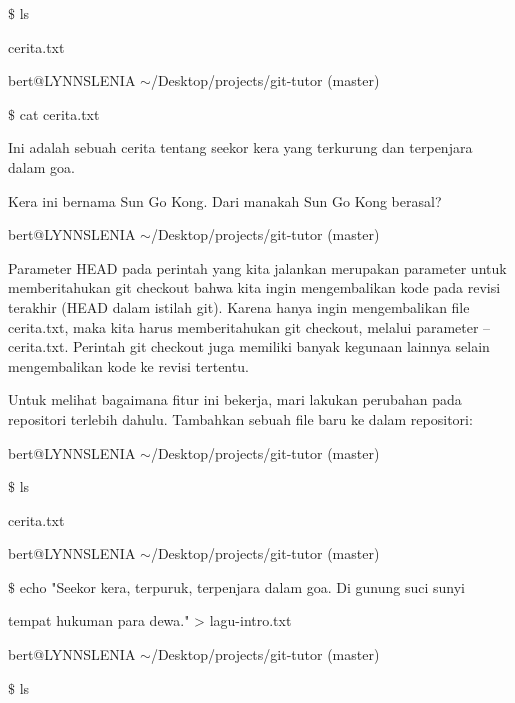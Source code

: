 \noindent 
 $  \$  $ ls \par
\noindent 
cerita.txt \par
\noindent 
bert@LYNNSLENIA  $  \sim  $/Desktop/projects/git-tutor (master) \par
\noindent 
 $  \$  $ cat cerita.txt \par
\noindent 
Ini adalah sebuah cerita tentang seekor kera yang terkurung dan terpenjara dalam goa. \par
\noindent 
Kera ini bernama Sun Go Kong. Dari manakah Sun Go Kong berasal? \par
\noindent 
bert@LYNNSLENIA  $  \sim  $/Desktop/projects/git-tutor (master) \par
\vspace{12pt}
Parameter HEAD pada perintah yang kita jalankan merupakan parameter untuk memberitahukan git checkout bahwa kita ingin mengembalikan kode pada revisi terakhir (HEAD dalam istilah git). Karena hanya ingin mengembalikan file cerita.txt, maka kita harus memberitahukan git checkout, melalui parameter -- cerita.txt. Perintah git checkout juga memiliki banyak kegunaan lainnya selain mengembalikan kode ke revisi tertentu.  \par
Untuk melihat bagaimana fitur ini bekerja, mari lakukan perubahan pada repositori terlebih dahulu. Tambahkan sebuah file baru ke dalam repositori: \par
\noindent 
{\fontsize{10pt}{10pt}\selectfont bert@LYNNSLENIA  $  \sim  $/Desktop/projects/git-tutor (master)} \par
\noindent 
{\fontsize{10pt}{10pt}\selectfont  $  \$  $ ls} \par
\noindent 
{\fontsize{10pt}{10pt}\selectfont cerita.txt} \par
\noindent 
\vspace{10pt}
\noindent 
{\fontsize{10pt}{10pt}\selectfont bert@LYNNSLENIA  $  \sim  $/Desktop/projects/git-tutor (master)} \par
\noindent 
{\fontsize{10pt}{10pt}\selectfont  $  \$  $ echo "Seekor kera, terpuruk, terpenjara dalam goa. Di gunung suci sunyi} \par
\noindent 
{\fontsize{10pt}{10pt}\selectfont tempat hukuman para dewa." > lagu-intro.txt} \par
\noindent 
\vspace{10pt}
\noindent 
{\fontsize{10pt}{10pt}\selectfont bert@LYNNSLENIA  $  \sim  $/Desktop/projects/git-tutor (master)} \par
\noindent 
{\fontsize{10pt}{10pt}\selectfont  $  \$  $ ls} \par
